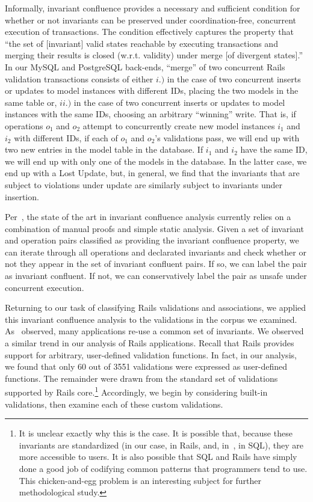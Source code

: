 Informally, invariant confluence provides a necessary and sufficient
condition for whether or not invariants can be preserved under
coordination-free, concurrent execution of transactions. The condition
effectively captures the property that ``the set of [invariant] valid
states reachable by executing transactions and merging their results
is closed (w.r.t. validity) under merge [of divergent states].'' In
our MySQL and PostgreSQL back-ends, ``merge'' of two concurrent Rails
validation transactions consists of either $i.)$ in the case of two
concurrent inserts or updates to model instances with different IDs,
placing the two models in the same table or, $ii.)$ in the case of two
concurrent inserts or updates to model instances with the same IDs,
choosing an arbitrary ``winning'' write. That is, if operations $o_1$
and $o_2$ attempt to concurrently create new model instances $i_1$ and
$i_2$ with different IDs, if each of $o_1$ and $o_2$'s validations
pass, we will end up with two new entries in the model table in the
database. If $i_1$ and $i_2$ have the same ID, we will end up with
only one of the models in the database. In the latter case, we end up
with a Lost Update, but, in general, we find that the invariants that
are subject to violations under update are similarly subject to
invariants under insertion.

Per~\cite{coord-avoid}, the state of the art in invariant confluence
analysis currently relies on a combination of manual proofs and simple
static analysis. Given a set of invariant and operation pairs
classified as providing the invariant confluence property, we can
iterate through all operations and declarated invariants and check
whether or not they appear in the set of invariant confluent pairs. If
so, we can label the pair as invariant confluent. If not, we can
conservatively label the pair as unsafe under concurrent execution.

Returning to our task of classifying Rails validations and
associations, we applied this invariant confluence analysis to the
validations in the corpus we examined. As~\cite{coord-avoid} observed,
many applications re-use a common set of invariants. We observed a
similar trend in our analysis of Rails applications. Recall that Rails
provides support for arbitrary, user-defined validation functions. In
fact, in our analysis, we found that only 60 out of 3551 validations
were expressed as user-defined functions. The remainder were drawn
from the standard set of validations supported by Rails
core.\footnote{It is unclear exactly why this is the case. It is
  possible that, because these invariants are standardized (in our
  case, in Rails, and, in~\cite{coord-avoid}, in SQL), they are more
  accessible to users. It is also possible that SQL and Rails have
  simply done a good job of codifying common patterns that programmers
  tend to use. This chicken-and-egg problem is an interesting subject
  for further methodological study.} Accordingly, we begin by
considering built-in validations, then examine each of these custom
validations.

